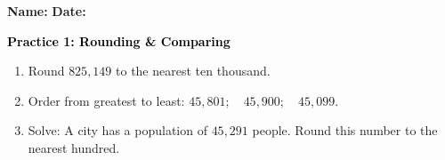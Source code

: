 \documentclass[12pt, letterpaper, fleqn]{article}
\begin{document}
\textbf{Name:} \underline{\hspace{5cm}}
\hfill
\textbf{Date:} \underline{\hspace{3cm}}\\

\begin{tcolorbox}[colback=customteal!20]
    \large\textcolor{black}{\textbf{Practice 1: Rounding & Comparing}}
\end{tcolorbox}
\begin{enumerate}[itemsep=3.5cm, leftmargin=0.6cm]
\item Round $825,149$ to the nearest ten thousand.
\vspace{3cm}
\item Order from greatest to least: $45,801; \quad 45,900; \quad 45,099$.
\vspace{3cm}
\item Solve: A city has a population of $45,291$ people. Round this number to the nearest hundred.
\end{enumerate}
\end{document}
